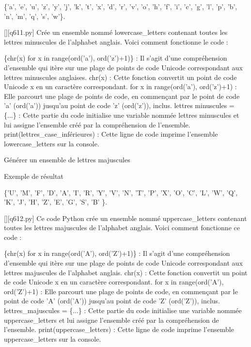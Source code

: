 \{'a', 'e', 'u', 'z', 'y', 'j', 'k', 't', 'x', 'd', 'r', 'v', 'o', 'h', 'f', 'i', 'c', 'g', 'l', 'p', 'b', 'n', 'm', 'q', 's', 'w'\}.
        \par
        \begin{solution}
            \renewcommand{\nomfichier}{q611.py}
            \pythonfile{\chemincode \nomfichier}[][\nomfichier]
            Crée un ensemble nommé lowercase\_letters contenant toutes les lettres minuscules de l'alphabet anglais. Voici comment fonctionne le code :

    \{chr(x) for x in range(ord('a'), ord('z')+1)\} : Il s'agit d'une compréhension d'ensemble qui itère sur une plage de points de code Unicode correspondant aux lettres minuscules anglaises.
        chr(x) : Cette fonction convertit un point de code Unicode x en un caractère correspondant.
        for x in range(ord('a'), ord('z')+1) : Elle parcourt une plage de points de code, en commençant par le point de code 'a' (ord('a')) jusqu'au point de code 'z' (ord('z')), inclus.
    lettres minuscules = \{...\} : Cette partie du code initialise une variable nommée lettres minuscules et lui assigne l'ensemble créé par la compréhension de l'ensemble.
    print(lettres\_case\_inférieures) : Cette ligne de code imprime l'ensemble lowercase\_letters sur la console.
        \end{solution}
        

        \question
        Générer un ensemble de lettres majuscules

Exemple de résultat

\{'U', 'M', 'F', 'D', 'A', 'I', 'R', 'Y', 'V', 'N', 'T', 'P', 'X', 'O', 'C', 'L', 'W', 'Q', 'K', 'J', 'H', 'Z', 'E', 'G', 'S', 'B' \}.
        \par
        \begin{solution}
            \renewcommand{\nomfichier}{q612.py}
            \pythonfile{\chemincode \nomfichier}[][\nomfichier]
            Ce code Python crée un ensemble nommé uppercase\_letters contenant toutes les lettres majuscules de l'alphabet anglais. Voici comment fonctionne ce code :

    \{chr(x) for x in range(ord('A'), ord('Z')+1)\} : Il s'agit d'une compréhension d'ensemble qui itère sur une plage de points de code Unicode correspondant aux lettres majuscules de l'alphabet anglais.
        chr(x) : Cette fonction convertit un point de code Unicode x en un caractère correspondant.
        for x in range(ord('A'), ord('Z')+1) : Elle parcourt une plage de points de code, en commençant par le point de code 'A' (ord('A')) jusqu'au point de code 'Z' (ord('Z')), inclus.
    lettres\_majuscules = \{...\} : Cette partie du code initialise une variable nommée uppercase\_letters et lui assigne l'ensemble créé par la compréhension de l'ensemble.
    print(uppercase\_letters) : Cette ligne de code imprime l'ensemble uppercase\_letters sur la console.
        \end{solution}
        

